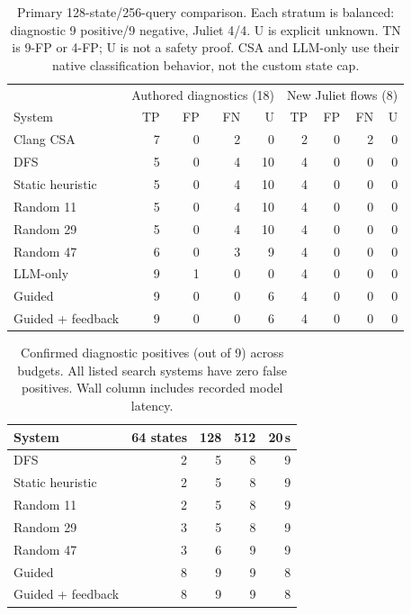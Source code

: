 \begin{table}[t]\centering\small
\caption{Primary 128-state/256-query comparison. Each stratum is balanced: diagnostic 9 positive/9 negative, Juliet 4/4. U is explicit unknown. TN is 9-FP or 4-FP; U is not a safety proof. CSA and LLM-only use their native classification behavior, not the custom state cap.}\label{tab:v3-primary}
\begin{tabular}{lrrrrrrrr}\toprule
&\multicolumn{4}{c}{Authored diagnostics (18)}&\multicolumn{4}{c}{New Juliet flows (8)}\\
System & TP & FP & FN & U & TP & FP & FN & U\\\midrule
Clang CSA & 7 & 0 & 2 & 0 & 2 & 0 & 2 & 0\\
DFS & 5 & 0 & 4 & 10 & 4 & 0 & 0 & 0\\
Static heuristic & 5 & 0 & 4 & 10 & 4 & 0 & 0 & 0\\
Random 11 & 5 & 0 & 4 & 10 & 4 & 0 & 0 & 0\\
Random 29 & 5 & 0 & 4 & 10 & 4 & 0 & 0 & 0\\
Random 47 & 6 & 0 & 3 & 9 & 4 & 0 & 0 & 0\\
LLM-only & 9 & 1 & 0 & 0 & 4 & 0 & 0 & 0\\
Guided & 9 & 0 & 0 & 6 & 4 & 0 & 0 & 0\\
Guided + feedback & 9 & 0 & 0 & 6 & 4 & 0 & 0 & 0\\
\bottomrule\end{tabular}\end{table}
\begin{table}[t]\centering\small
\caption{Confirmed diagnostic positives (out of 9) across budgets. All listed search systems have zero false positives. Wall column includes recorded model latency.}\label{tab:v3-budgets}
\begin{tabular}{lrrrr}\toprule System&64 states&128&512&20\,s\\\midrule
DFS & 2 & 5 & 8 & 9\\
Static heuristic & 2 & 5 & 8 & 9\\
Random 11 & 2 & 5 & 8 & 9\\
Random 29 & 3 & 5 & 8 & 9\\
Random 47 & 3 & 6 & 9 & 9\\
Guided & 8 & 9 & 9 & 8\\
Guided + feedback & 8 & 9 & 9 & 8\\
\bottomrule\end{tabular}\end{table}
